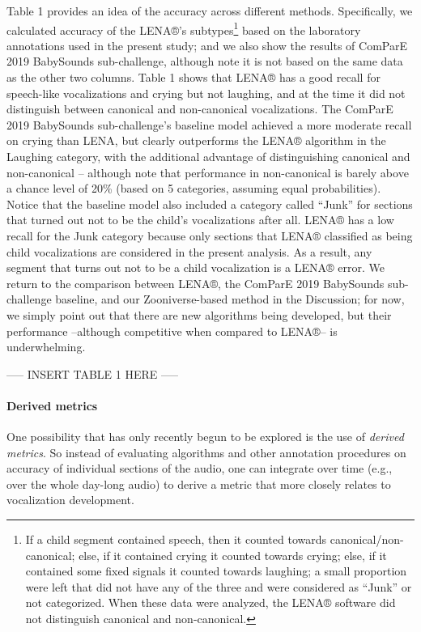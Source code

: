 \documentclass[
  english,
  ,man]{apa6}
\let\oldparagraph\paragraph
\renewcommand{\paragraph}[1]{\oldparagraph{#1}\mbox{}}
\begin{document}
Table 1 provides an idea of the accuracy across different methods. Specifically, we calculated accuracy of the LENA®'s subtypes\footnote{If a child segment contained speech, then it counted towards canonical/non-canonical; else, if it contained crying it counted towards crying; else, if it contained some fixed signals it counted towards laughing; a small proportion were left that did not have any of the three and were considered as ``Junk'' or not categorized. When these data were analyzed, the LENA® software did not distinguish canonical and non-canonical.} based on the laboratory annotations used in the present study; and we also show the results of ComParE 2019 BabySounds sub-challenge, although note it is not based on the same data as the other two columns. Table 1 shows that LENA® has a good recall for speech-like vocalizations and crying but not laughing, and at the time it did not distinguish between canonical and non-canonical vocalizations. The ComParE 2019 BabySounds sub-challenge's baseline model achieved a more moderate recall on crying than LENA, but clearly outperforms the LENA® algorithm in the Laughing category, with the additional advantage of distinguishing canonical and non-canonical -- although note that performance in non-canonical is barely above a chance level of 20\% (based on 5 categories, assuming equal probabilities). Notice that the baseline model also included a category called ``Junk'' for sections that turned out not to be the child's vocalizations after all. LENA® has a low recall for the Junk category because only sections that LENA® classified as being child vocalizations are considered in the present analysis. As a result, any segment that turns out not to be a child vocalization is a LENA® error. We return to the comparison between LENA®, the ComParE 2019 BabySounds sub-challenge baseline, and our Zooniverse-based method in the Discussion; for now, we simply point out that there are new algorithms being developed, but their performance --although competitive when compared to LENA®-- is underwhelming.

----- INSERT TABLE 1 HERE -----

\hypertarget{derived-metrics}{%
\paragraph{Derived metrics}\label{derived-metrics}}

One possibility that has only recently begun to be explored is the use of \emph{derived metrics}. So instead of evaluating algorithms and other annotation procedures on accuracy of individual sections of the audio, one can integrate over time (e.g., over the whole day-long audio) to derive a metric that more closely relates to vocalization development.
\end{document}
